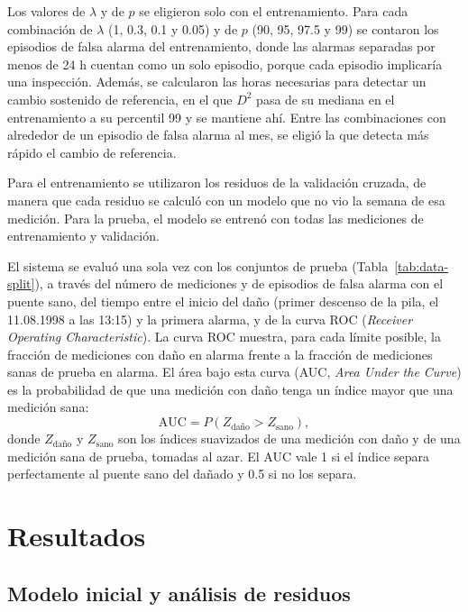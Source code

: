 \documentclass[9pt,twocolumn,twoside]{opticajnl}
\begin{document}
Los valores de $\lambda$ y de $p$ se eligieron solo con el entrenamiento. Para cada combinación de $\lambda$ (1, 0.3, 0.1 y 0.05) y de $p$ (90, 95, 97.5 y 99) se contaron los episodios de falsa alarma del entrenamiento, donde las alarmas separadas por menos de 24 h cuentan como un solo episodio, porque cada episodio implicaría una inspección. Además, se calcularon las horas necesarias para detectar un cambio sostenido de referencia, en el que $D^2$ pasa de su mediana en el entrenamiento a su percentil 99 y se mantiene ahí. Entre las combinaciones con alrededor de un episodio de falsa alarma al mes, se eligió la que detecta más rápido el cambio de referencia.

Para el entrenamiento se utilizaron los residuos de la validación cruzada, de manera que cada residuo se calculó con un modelo que no vio la semana de esa medición. Para la prueba, el modelo se entrenó con todas las mediciones de entrenamiento y validación.

El sistema se evaluó una sola vez con los conjuntos de prueba (Tabla~\ref{tab:data-split}), a través del número de mediciones y de episodios de falsa alarma con el puente sano, del tiempo entre el inicio del daño (primer descenso de la pila, el 11.08.1998 a las 13:15) y la primera alarma, y de la curva ROC (\emph{Receiver Operating Characteristic}). La curva ROC muestra, para cada límite posible, la fracción de mediciones con daño en alarma frente a la fracción de mediciones sanas de prueba en alarma. El área bajo esta curva (AUC, \emph{Area Under the Curve}) es la probabilidad de que una medición con daño tenga un índice mayor que una medición sana:
\begin{equation}
\text{AUC} = P\left(Z_\text{daño} > Z_\text{sano}\right),
\label{eq:auc}
\end{equation}
donde $Z_\text{daño}$ y $Z_\text{sano}$ son los índices suavizados de una medición con daño y de una medición sana de prueba, tomadas al azar. El AUC vale 1 si el índice separa perfectamente al puente sano del dañado y 0.5 si no los separa.

\section{Resultados}

\subsection{Modelo inicial y análisis de residuos}
\label{sec:results-initial}
\end{document}
